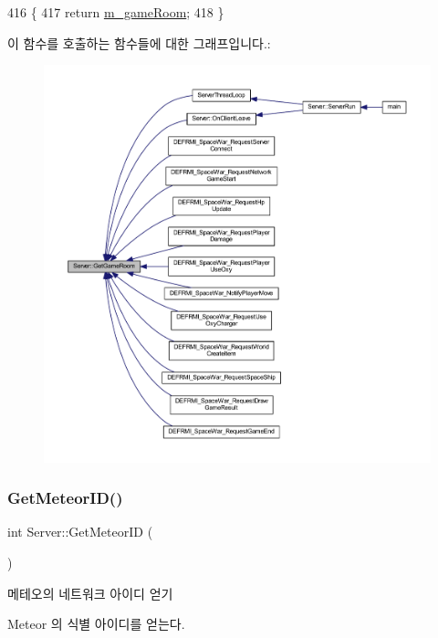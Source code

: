 \begin{DoxyCode}
416 \{
417     \textcolor{keywordflow}{return} \hyperlink{class_server_a77f414d5bb41dd5de8626d8cd621113c}{m\_gameRoom};
418 \}
\end{DoxyCode}
이 함수를 호출하는 함수들에 대한 그래프입니다.\+:\nopagebreak
\begin{figure}[H]
\begin{center}
\leavevmode
\includegraphics[width=350pt]{class_server_ab5d6fa91446df16909dfbea64abddf76_icgraph}
\end{center}
\end{figure}
\mbox{\label{class_server_a2c9b6a25a8add5d74b5f3bcfeff956ec}} 
\subsubsection{\texorpdfstring{Get\+Meteor\+I\+D()}{GetMeteorID()}}
{\footnotesize\ttfamily int Server\+::\+Get\+Meteor\+ID (\begin{DoxyParamCaption}{ }\end{DoxyParamCaption})}



메테오의 네트워크 아이디 얻기 

Meteor 의 식별 아이디를 얻는다.

